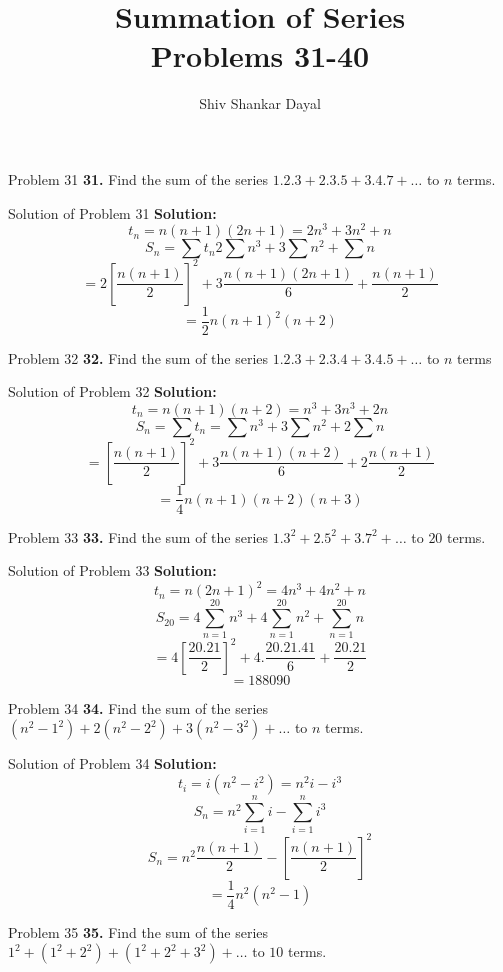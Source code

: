 \documentclass[aspectratio=1610,8pt]{beamer}
\title{Summation of Series\\Problems 31-40}
\author[Shiv Shankar Dayal]{Shiv Shankar Dayal}
\begin{document}
\begin{frame}
  \titlepage
\end{frame}
\begin{frame}{Problem 31}
  \textbf{31.} Find the sum of the series $1.2.3 + 2.3.5 + 3.4.7 + \ldots$ to $n$ terms.
\end{frame}
\begin{frame}{Solution of Problem 31}
  \textbf{Solution:} $$t_n = n(n + 1)(2n + 1) = 2n^3 + 3n^2 + n$$
  $$S_n = \sum t_n 2\sum n^3 + 3\sum n^2 + \sum n$$
  $$= 2\left[\frac{n(n + 1)}{2}\right]^2 + 3\frac{n(n + 1)(2n + 1)}{6} + \frac{n(n + 1)}{2}$$
  $$= \frac{1}{2}n(n + 1)^2(n + 2)$$
\end{frame}
\begin{frame}{Problem 32}
  \textbf{32.} Find the sum of the series $1.2.3 + 2.3.4 + 3.4.5 + \ldots$ to $n$ terms
\end{frame}
\begin{frame}{Solution of Problem 32}
  \textbf{Solution:} $$t_n = n(n + 1)(n + 2) = n^3 + 3n^3 + 2n$$
  $$S_n = \sum t_n = \sum n^3 + 3\sum n^2 + 2\sum n$$
  $$= \left[\frac{n(n + 1)}{2}\right]^2 + 3\frac{n(n + 1)(n + 2)}{6} + 2\frac{n(n + 1)}{2}$$
  $$= \frac{1}{4}n(n + 1)(n + 2)(n + 3)$$
\end{frame}
\begin{frame}{Problem 33}
  \textbf{33.} Find the sum of the series $1.3^2 + 2.5^2 + 3.7^2 + \ldots$ to $20$ terms.
\end{frame}
\begin{frame}{Solution of Problem 33}
  \textbf{Solution:} $$t_n = n(2n + 1)^2 = 4n^3 + 4n^2 + n$$
  $$S_{20} = 4\sum_{n = 1}^{20}n^3 + 4\sum_{n = 1}^{20}n^2 + \sum_{n = 1}^{20}n$$
  $$= 4\left[\frac{20.21}{2}\right]^2 + 4.\frac{20.21.41}{6} + \frac{20.21}{2}$$
  $$= 188090$$
\end{frame}
\begin{frame}{Problem 34}
  \textbf{34.} Find the sum of the series $(n^2 - 1^2) + 2(n^2 - 2^2) + 3(n^2 - 3^2) + \ldots$ to $n$ terms.
\end{frame}
\begin{frame}{Solution of Problem 34}
  \textbf{Solution:}$$t_i = i(n^2 - i^2) = n^2i -i^3$$
  $$S_n = n^2\sum_{i = 1}^n i - \sum_{i = 1}^n i^3$$
  $$S_n = n^2\frac{n(n + 1)}{2} - \left[\frac{n(n + 1)}{2}\right]^2$$
  $$ = \frac{1}{4}n^2(n^2 - 1)$$
\end{frame}
\begin{frame}{Problem 35}
  \textbf{35.} Find the sum of the series $1^2 + (1^2 + 2^2) + (1^2 + 2^2 + 3^2) + \ldots$ to $10$ terms.
\end{frame}
\end{document}
